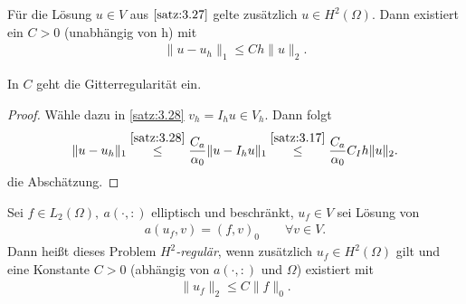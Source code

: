 \begin{Folgerung}
    \label{folgerung:3.29}
    Für die Lösung $u\in V$ aus $\eqref{satz:3.27}$ gelte zusätzlich
    $u\in H^2(\Omega)$. Dann existiert ein $C > 0$ (unabhängig von h) mit
    \begin{eqnarray*}
        \|u - u_h\|_1 \le C h \|u\|_2.
    \end{eqnarray*}
\end{Folgerung}


\begin{Bemerkung}
    In $C$ geht die Gitterregularität ein.
\end{Bemerkung}


\begin{proof}
    Wähle dazu in \eqref{satz:3.28} $v_h = I_h u \in V_h$.
    Dann folgt
    \begin{eqnarray*}
            \|u - u_h\|_1
        \stackrel{\eqref{satz:3.28}}{\le}
            \frac{C_a}{\alpha_0} \|u - I_hu\|_1
        \stackrel{\eqref{satz:3.17}}{\le}
            \frac{C_a}{\alpha_0} C_I h \|u\|_2.
    \end{eqnarray*}
    die Abschätzung.
\end{proof}


\begin{Definition}
    \label{def:3.30}
    Sei $f\in L_2(\Omega), \ a(\cdot, :)$ elliptisch und beschränkt,
    $u_f\in V$ sei Lösung von
    \begin{eqnarray*}
        a(u_f, v) = (f, v)_0 \qquad \forall v\in V.
    \end{eqnarray*}
    Dann hei\ss{}t dieses Problem \emph{$H^2$-regulär}, wenn zusätzlich
    $u_f \in H^2(\Omega)$ gilt und eine Konstante $C > 0$
    (abhängig von $a(\cdot, :)$ und $\Omega$) existiert mit
    \begin{eqnarray*}
        \|u_f\|_2 \le C \|f\|_0.
    \end{eqnarray*}
\end{Definition}


